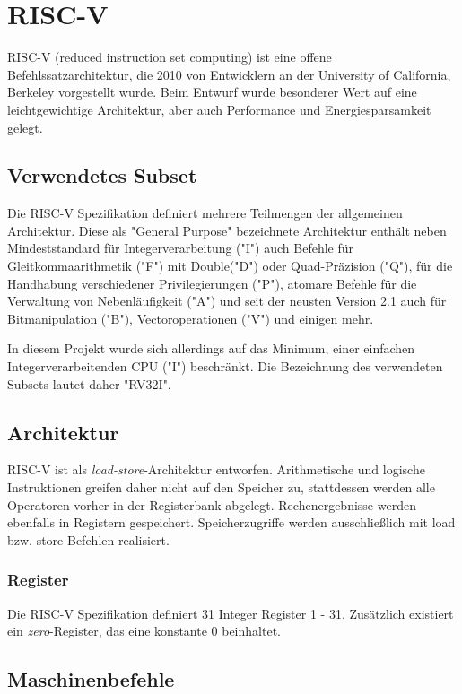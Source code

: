 \chapter{RISC-V} %
\label{RISC-V} %

RISC-V (reduced instruction set computing) ist eine offene Befehlssatzarchitektur, die 2010 von Entwicklern an der University of California, Berkeley vorgestellt wurde. Beim Entwurf wurde besonderer Wert auf eine leichtgewichtige Architektur, aber auch Performance und Energiesparsamkeit gelegt.

\section{Verwendetes Subset}
Die RISC-V Spezifikation definiert mehrere Teilmengen der allgemeinen Architektur. Diese als "General Purpose" bezeichnete Architektur enthält neben Mindeststandard für Integerverarbeitung ("I") auch Befehle für Gleitkommaarithmetik ("F") mit Double("D") oder Quad-Präzision ("Q"), für die Handhabung verschiedener Privilegierungen ("P"), atomare Befehle für die Verwaltung von Nebenläufigkeit ("A") und seit der neusten Version  2.1 auch für Bitmanipulation ("B"), Vectoroperationen ("V") und einigen mehr.

In diesem Projekt wurde sich allerdings auf das Minimum, einer einfachen Integerverarbeitenden CPU ("I") beschränkt. Die Bezeichnung des verwendeten Subsets lautet daher "RV32I".

\section{Architektur}
RISC-V ist als \textit{load-store}-Architektur entworfen. Arithmetische und logische Instruktionen greifen daher nicht auf den Speicher zu, stattdessen werden alle Operatoren vorher in der Registerbank abgelegt. Rechenergebnisse werden ebenfalls in Registern gespeichert. Speicherzugriffe werden ausschließlich mit load bzw. store Befehlen realisiert.

\subsection{Register}
Die RISC-V Spezifikation definiert 31 Integer Register 1 - 31. Zusätzlich existiert ein \textit{zero}-Register, das eine konstante 0 beinhaltet.

\section{Maschinenbefehle}

